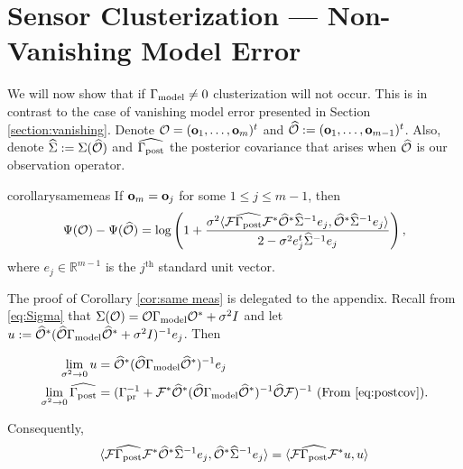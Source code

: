 \section{Sensor Clusterization --- Non-Vanishing Model Error}\label{section:non vanishing}
We will now show that if $\Gamma_{\textup{model}} \neq 0$ clusterization will not
occur. This is in contrast to the case of vanishing model error
presented in Section \ref{section:vanishing}. Denote $\mathcal{O} =
(\mathbf{o}_1,\dots,\mathbf{o}_m)^t$ and $\widehat{\mathcal{O}} :=
(\mathbf{o}_1,\dots,\mathbf{o}_{m-1})^t$. Also, denote $\widehat{\Sigma} := \Sigma
(\widehat{\mathcal{O}})$ and $\widehat{\Gamma_{\textup{post}}}$ the posterior covariance that arises when
$\widehat{\mathcal{O}}$ is our observation operator.
\begin{restatable*}{corollary}{samemeas}\label{cor:same meas}
  If $\mathbf{o}_m = \mathbf{o}_j$ for some $1 \leq j \leq m-1$, then
  \begin{equation*}
    \tar(\obs) - \tar(\obsm) =
    \log \left ( 1 + \frac{\sigma^2
      \langle \fwd \postcovm \fwd^* \obsm^* \Sigmam^{-1} e_j,
      \obsm^* \Sigmam^{-1}e_j \rangle
    }{
      2 - \sigma^2 e_j^t\Sigmam^{-1}e_j 
    }       
    \right ),
  \end{equation*}
  where $e_j\in \mathbb{R}^{m-1}$ is the $j^{\text{th}}$ standard unit
  vector.
\end{restatable*}
The proof of Corollary \ref{cor:same meas} is delegated to the
appendix. Recall from \eqref{eq:Sigma} that $\Sigma(\mathcal{O}) = \mathcal{O}
\Gamma_{\textup{model}} \mathcal{O}^* + \sigma^2I$ and let $u := \widehat{\mathcal{O}}^* (\widehat{\mathcal{O}} \Gamma_{\textup{model}}
\widehat{\mathcal{O}}^* + \sigma^2 I)^{-1}e_j$. Then

\begin{align*}
  \begin{split}
    \lim_{\sigma^2 \to 0} u &= \obsm^*(\obsm \modcov \obsm^*)^{-1}e_j\\
    \lim_{\sigma^2 \to 0} \postcovm &= (\prcov^{-1} + \fwd^* \obsm^* (\obsm \modcov \obsm^*)^{-1} \obsm \fwd)^{-1} \text{ (From \eqref{eq:postcov})}.
  \end{split}
\end{align*}

Consequently, 
\begin{equation*}
   \langle \fwd \postcovm \fwd^* \obsm^* \Sigmam^{-1}
    e_j, \obsm^* \Sigmam^{-1}e_j \rangle 
  = \langle \fwd \postcovm \fwd^* u, u \rangle
\end{equation*}

